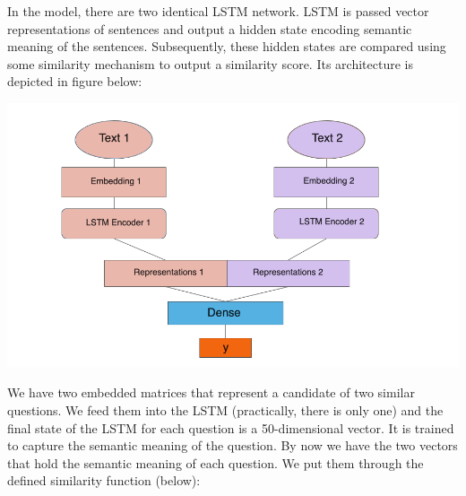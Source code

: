 \documentclass[runningheads]{llncs}
\begin{document}
	In the model, there are two identical LSTM network. LSTM is passed vector representations of sentences and output a hidden state encoding semantic meaning of the sentences. Subsequently, these hidden states are compared using some similarity mechanism to output a similarity score.
	Its architecture is depicted in figure below:
	
	\begin{minipage}{\linewidth}
		\begin{center}
			\includegraphics[width=\linewidth]{Siamese_Network.png}
			\label{fig:Siamese LSTM Architectture}
		\end{center}
	\end{minipage}
	\afterpage{\clearpage}
	
	We have two embedded matrices that represent a candidate of two similar questions.  We feed them into the LSTM (practically, there is only one) and the final state of the LSTM for each question is a 50-dimensional vector. It is trained to capture the semantic meaning of the question. By now we have the two vectors that hold the semantic meaning of each question. We put them through the defined similarity function (below):
	
	\begin{minipage}{\linewidth}
		\begin{center}
		\end{center}
	\end{minipage}
	\afterpage{\clearpage}
	
\end{document}
